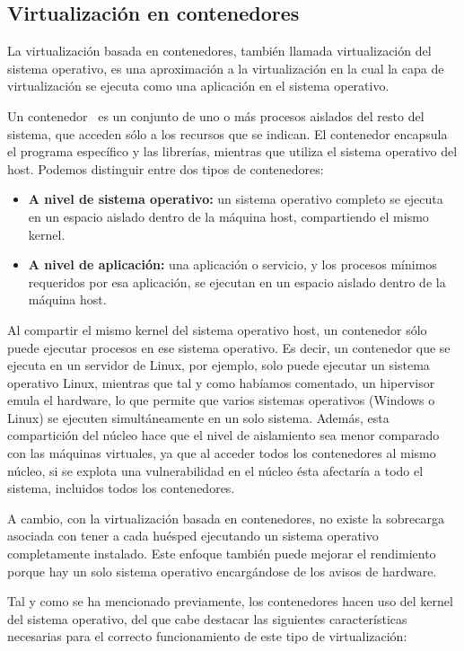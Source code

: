 \clearpage
\subsection{Virtualización en contenedores} \label{sec:cont}
La virtualización basada en contenedores, también llamada virtualización del sistema operativo, es una aproximación a la virtualización en la cual la capa de virtualización se ejecuta como una aplicación en el sistema operativo.

Un contenedor~\cite{cont1} es un conjunto de uno o más procesos aislados del resto del sistema, que acceden sólo a los recursos que se indican. El contenedor encapsula el programa específico y las librerías, mientras que utiliza el sistema operativo del host. Podemos distinguir entre dos tipos de contenedores:~\cite{cont2}

\begin{itemize}
	\item \textbf{A nivel de sistema operativo:} un sistema operativo completo se ejecuta en un espacio aislado dentro de la máquina host, compartiendo el mismo kernel.
	\item \textbf{A nivel de aplicación:} una aplicación o servicio, y los procesos mínimos requeridos por esa aplicación, se ejecutan en un espacio aislado dentro de la máquina host.
\end{itemize}

Al compartir el mismo kernel del sistema operativo host, un contenedor sólo puede ejecutar procesos en ese sistema operativo. Es decir, un contenedor que se ejecuta en un servidor de Linux, por ejemplo, solo puede ejecutar un sistema operativo Linux, mientras que tal y como habíamos comentado, un hipervisor emula el hardware, lo que permite que varios sistemas operativos (Windows o Linux) se ejecuten simultáneamente en un solo sistema. Además, esta compartición del núcleo hace que el nivel de aislamiento sea menor comparado con las máquinas virtuales, ya que al acceder todos los contenedores al mismo núcleo, si se explota una vulnerabilidad en el núcleo ésta afectaría a todo el sistema, incluidos todos los contenedores.

A cambio, con la virtualización basada en contenedores, no existe la sobrecarga asociada con tener a cada huésped ejecutando un sistema operativo completamente instalado. Este enfoque también puede mejorar el rendimiento porque hay un solo sistema operativo encargándose de los avisos de hardware.

Tal y como se ha mencionado previamente, los contenedores hacen uso del kernel del sistema operativo, del que cabe destacar las siguientes características necesarias para el correcto funcionamiento de este tipo de virtualización:~\cite{cont3}

